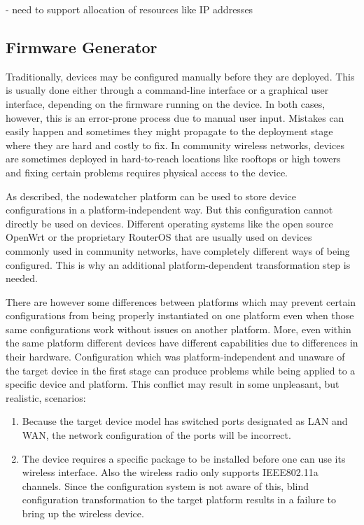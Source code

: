 \documentclass[5p,sort&compress]{elsarticle}
\begin{document}
- need to support allocation of resources like IP addresses

\subsection{Firmware Generator}
\label{sec:firmware-generator}

Traditionally, devices may be configured manually before they are deployed. This is usually done either through a command-line interface or a graphical user interface, depending on the firmware running on the device. In both cases, however, this is an error-prone process due to manual user input. Mistakes can easily happen and sometimes they might propagate to the deployment stage where they are hard and costly to fix. In community wireless networks, devices are sometimes deployed in hard-to-reach locations like rooftops or high towers and fixing certain problems requires physical access to the device.

As described, the nodewatcher platform can be used to store device configurations in a platform-independent way. But this configuration cannot directly be used on devices. Different operating systems like the open source OpenWrt or the proprietary RouterOS that are usually used on devices commonly used in community networks, have completely different ways of being configured. This is why an additional platform-dependent transformation step is needed.

There are however some differences between platforms which may prevent certain configurations from being properly instantiated on one platform even when those same configurations work without issues on another platform. More, even within the same platform different devices have different capabilities due to differences in their hardware. Configuration which was platform-independent and unaware of the target device in the first stage can produce problems while being applied to a specific device and platform. This conflict may result in some unpleasant, but realistic, scenarios:
\begin{enumerate}[label=\roman*)]
\item Because the target device model has switched ports designated as LAN and WAN, the network configuration of the ports will be incorrect.

\item The device requires a specific package to be installed before one can use its wireless interface. Also the wireless radio only supports IEEE802.11a channels. Since the configuration system is not aware of this, blind configuration transformation to the target platform results in a failure to bring up the wireless device.

\end{enumerate}
\end{document}
